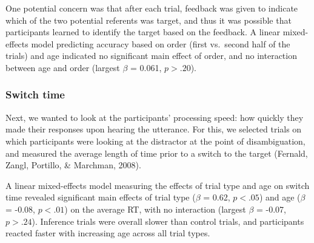 \documentclass[a4paper,man,apacite,floatsintext]{apa6}
\begin{document}
One potential concern was that after each trial, feedback was given to
indicate which of the two potential referents was target, and thus it
was possible that participants learned to identify the target based on
the feedback. A linear mixed-effects model predicting accuracy based on
order (first vs.~second half of the trials) and age indicated no
significant main effect of order, and no interaction between age and
order (largest \(\beta\) = 0.061, \(p >.20\)).

\subsubsection{Switch time}\label{switch-time}

Next, we wanted to look at the participants' processing speed: how
quickly they made their responses upon hearing the utterance. For this,
we selected trials on which participants were looking at the distractor
at the point of disambiguation, and measured the average length of time
prior to a switch to the target (Fernald, Zangl, Portillo, \& Marchman,
2008).

A linear mixed-effects model measuring the effects of trial type and age
on switch time revealed significant main effects of trial type
(\(\beta\) = 0.62, \(p <.05\)) and age (\(\beta\) = -0.08, \(p <.01\))
on the average RT, with no interaction (largest \(\beta\) = -0.07,
\(p >.24\)). Inference trials were overall slower than control trials,
and participants reacted faster with increasing age across all trial
types.
\end{document}
